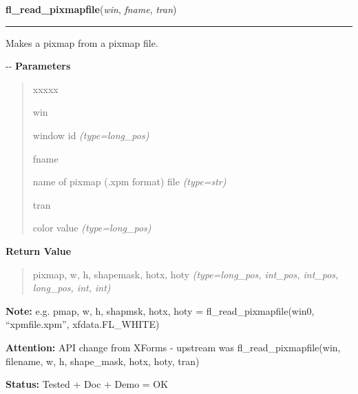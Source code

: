 \hspace{.8\funcindent}\begin{boxedminipage}{\funcwidth}

    \raggedright \textbf{fl\_read\_pixmapfile}(\textit{win}, \textit{fname}, \textit{tran})

    \vspace{-1.5ex}

    \rule{\textwidth}{0.5\fboxrule}
\setlength{\parskip}{2ex}

Makes a pixmap from a pixmap file.

-{}-
\setlength{\parskip}{1ex}
      \textbf{Parameters}
      \vspace{-1ex}

      \begin{quote}
        \begin{Ventry}{xxxxx}

          \item[win]


window id
            {\it (type=long\_pos)}

          \item[fname]


name of pixmap (.xpm format) file
            {\it (type=str)}

          \item[tran]


color value
            {\it (type=long\_pos)}

        \end{Ventry}

      \end{quote}

      \textbf{Return Value}
    \vspace{-1ex}

      \begin{quote}

pixmap, w, h, shapemask, hotx, hoty
      {\it (type=long\_pos, int\_pos, int\_pos, long\_pos, int, int)}

      \end{quote}

\textbf{Note:} 
e.g. pmap, w, h, shapmsk, hotx, hoty = fl\_read\_pixmapfile(win0,         ``xpmfile.xpm'', xfdata.FL\_WHITE)


\textbf{Attention:} 
API change from XForms - upstream was
fl\_read\_pixmapfile(win, filename, w, h, shape\_mask, hotx, hoty, tran)


\textbf{Status:} 
Tested + Doc + Demo = OK


    \end{boxedminipage}

